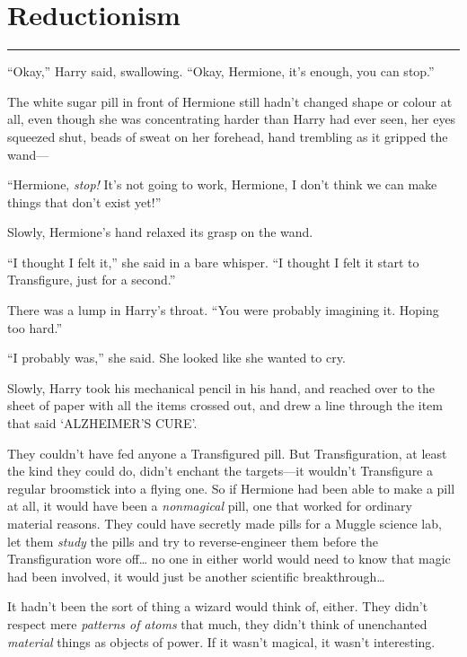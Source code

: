 \chapter{Reductionism}

\begin{center}\rule{3in}{0.4pt}\end{center}

``Okay,'' Harry said, swallowing. ``Okay, Hermione, it's enough, you can
stop.''

The white sugar pill in front of Hermione still hadn't changed shape or
colour at all, even though she was concentrating harder than Harry had
ever seen, her eyes squeezed shut, beads of sweat on her forehead, hand
trembling as it gripped the wand---

``Hermione, \emph{stop!} It's not going to work, Hermione, I don't think
we can make things that don't exist yet!''

Slowly, Hermione's hand relaxed its grasp on the wand.

``I thought I felt it,'' she said in a bare whisper. ``I thought I felt
it start to Transfigure, just for a second.''

There was a lump in Harry's throat. ``You were probably imagining it.
Hoping too hard.''

``I probably was,'' she said. She looked like she wanted to cry.

Slowly, Harry took his mechanical pencil in his hand, and reached over
to the sheet of paper with all the items crossed out, and drew a line
through the item that said `ALZHEIMER'S CURE'.

They couldn't have fed anyone a Transfigured pill. But Transfiguration,
at least the kind they could do, didn't enchant the targets---it
wouldn't Transfigure a regular broomstick into a flying one. So if
Hermione had been able to make a pill at all, it would have been a
\emph{nonmagical} pill, one that worked for ordinary material reasons.
They could have secretly made pills for a Muggle science lab, let them
\emph{study} the pills and try to reverse-engineer them before the
Transfiguration wore off\ldots{} no one in either world would need to
know that magic had been involved, it would just be another scientific
breakthrough\ldots{}

It hadn't been the sort of thing a wizard would think of, either. They
didn't respect mere \emph{patterns of atoms} that much, they didn't
think of unenchanted \emph{material} things as objects of power. If it
wasn't magical, it wasn't interesting.

